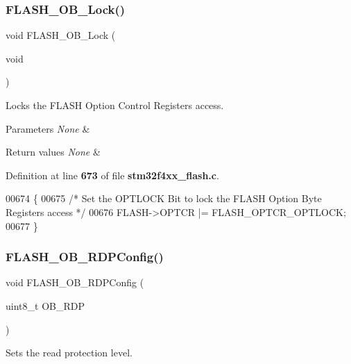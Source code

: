 \subsubsection{F\+L\+A\+S\+H\+\_\+\+O\+B\+\_\+\+Lock()}
{\footnotesize\ttfamily void F\+L\+A\+S\+H\+\_\+\+O\+B\+\_\+\+Lock (\begin{DoxyParamCaption}\item[{void}]{ }\end{DoxyParamCaption})}



Locks the F\+L\+A\+SH Option Control Registers access. 


\begin{DoxyParams}{Parameters}
{\em None} & \\
\hline
\end{DoxyParams}

\begin{DoxyRetVals}{Return values}
{\em None} & \\
\hline
\end{DoxyRetVals}


Definition at line \textbf{ 673} of file \textbf{ stm32f4xx\+\_\+flash.\+c}.


\begin{DoxyCode}
00674 \{
00675   \textcolor{comment}{/* Set the OPTLOCK Bit to lock the FLASH Option Byte Registers access */}
00676   FLASH->OPTCR |= FLASH_OPTCR_OPTLOCK;
00677 \}
\end{DoxyCode}
\mbox{\label{group__FLASH_ga12cb6799f725a49cd151eef4d6d1789b}} 
\subsubsection{F\+L\+A\+S\+H\+\_\+\+O\+B\+\_\+\+R\+D\+P\+Config()}
{\footnotesize\ttfamily void F\+L\+A\+S\+H\+\_\+\+O\+B\+\_\+\+R\+D\+P\+Config (\begin{DoxyParamCaption}\item[{uint8\+\_\+t}]{O\+B\+\_\+\+R\+DP }\end{DoxyParamCaption})}



Sets the read protection level. 


